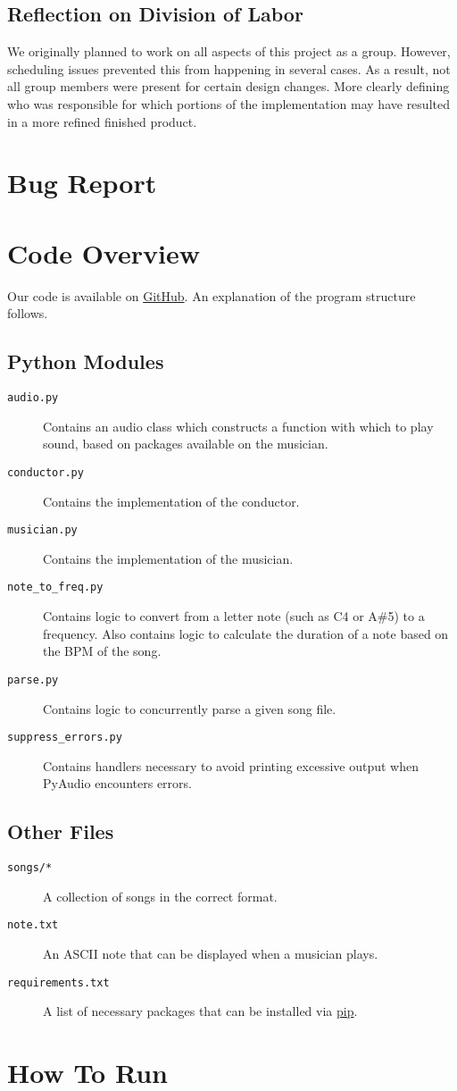 \documentclass[12pt, letterpaper]{article}
\begin{document}
\subsection{Reflection on Division of Labor}
We originally planned to work on all aspects of this project as a group. However, scheduling issues
prevented this from happening in several cases. As a result, not all group members were present for
certain design changes. More clearly defining who was responsible for which portions of the
implementation may have resulted in a more refined finished product.

\section{Bug Report}


\section{Code Overview}
Our code is available on \href{https://github.com/TylerLubeck/ConcurrentMusic}{GitHub}. An
explanation of the program structure follows.

\subsection{Python Modules}
\begin{description}
\item[\texttt{audio.py}] Contains an audio class which constructs a function with which to play
sound, based on packages available on the musician.
\item[\texttt{conductor.py}] Contains the implementation of the conductor.
\item[\texttt{musician.py}] Contains the implementation of the musician.
\item[\texttt{note\_to\_freq.py}] Contains logic to convert from a letter note (such as C4 or A\#5)
to a frequency. Also contains logic to calculate the duration of a note based on the BPM of the
song.
\item[\texttt{parse.py}] Contains logic to concurrently parse a given song file.
\item[\texttt{suppress\_errors.py}] Contains handlers necessary to avoid printing excessive output
when PyAudio encounters errors.
\end{description}

\subsection{Other Files}
\begin{description}
\item[\texttt{songs/*}] A collection of songs in the correct format.
\item[\texttt{note.txt}] An ASCII note that can be displayed when a musician plays.
\item[\texttt{requirements.txt}] A list of necessary packages that can be installed via
\href{https://pypi.python.org/pypi/pip}{pip}.
\end{description}

\section{How To Run}
\end{document}

